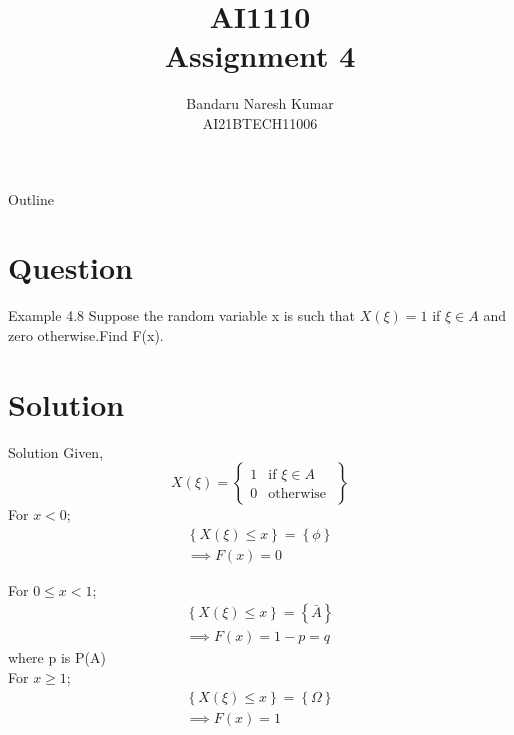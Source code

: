\documentclass{beamer}
\title{AI1110 \\ Assignment 4}
\author{Bandaru Naresh Kumar \\ AI21BTECH11006}
\date{}
\begin{document}
	\begin{frame}
		\titlepage
	\end{frame}
	
	\begin{frame}{Outline}
    		\tableofcontents
	\end{frame}
	
	\section{Question}
	\begin{frame}{Example 4.8}
	Suppose the random variable x is such that $X(\xi)= 1$ if $\xi \in A$ and zero otherwise.Find F(x).\\
	\end{frame}
	
	\section{Solution}
	\begin{frame}{Solution}
	Given,\\
	\begin{equation}
X(\xi) = 
\left\{
    \begin{array}{lr}
        1 & \text{if } \xi \in A\\
        0 & \text{otherwise }
    \end{array}
\right\}
\end{equation} 
For $x<0$;
\begin{align}
\left\lbrace X(\xi) \leq x\right\rbrace  = \left\lbrace \phi\right\rbrace \\
\implies F(x) = 0
\end{align}
	\end{frame}
		
	\begin{frame}{}
For $0 \leq x<1$;
\begin{align}
\left\lbrace X(\xi) \leq x\right\rbrace  = \left\lbrace \bar{A}\right\rbrace \\
\implies F(x) = 1-p = q
\end{align}
where p is P(A)	\\
For $x \geq1$;
\begin{align}
\left\lbrace X(\xi) \leq x\right\rbrace  = \left\lbrace \Omega\right\rbrace \\
\implies F(x) = 1
\end{align}
	\end{frame}
	
\end{document}
